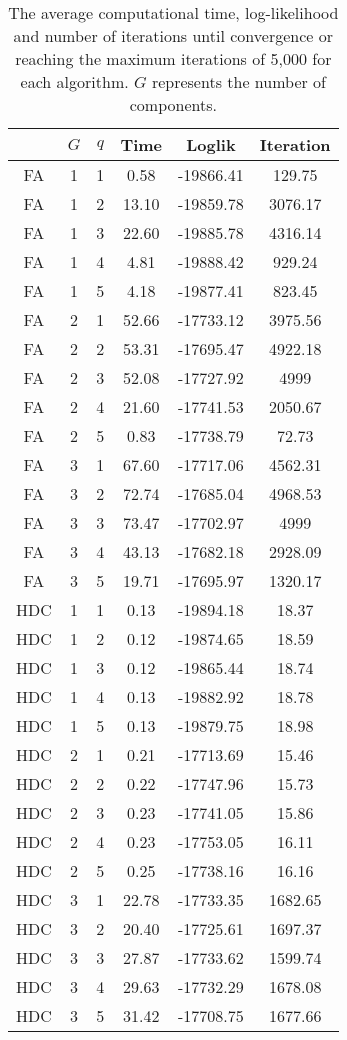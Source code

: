 \documentclass[11pt]{article}
\begin{document}
\begin {table}
\caption {The average computational time, log-likelihood and number of iterations until convergence or reaching the maximum iterations of 5,000 for each algorithm. $G$ represents the number of components.} \label{tab:title} 
\begin{center}
\def\arraystretch{1.5}
\begin{tabular}{ |c|c|c|c|c|c| } 
\hline
 & $G$ & $q$ & Time & Loglik & Iteration\\
\hline
FA&1&	1&0.58	&-19866.41&	129.75\\
FA&1&	2&13.10&	-19859.78&	3076.17\\
FA&1&	3&22.60&	-19885.78&	4316.14\\
FA&1&	4&4.81&	-19888.42&	929.24\\
FA&1&	5&4.18&	-19877.41&	823.45\\
FA&2&	1&52.66&	-17733.12	&3975.56\\
FA&2&	2&53.31&	-17695.47&	4922.18\\
FA&2&	3&52.08&	-17727.92&	4999\\
FA&2&	4&21.60&	-17741.53&	2050.67\\
FA&2&	5&0.83&	-17738.79&	72.73\\
FA&3&	1&67.60&	-17717.06&	4562.31\\
FA&3&	2&72.74&	-17685.04&	4968.53\\
FA&3&	3&73.47&	-17702.97&	4999\\
FA&3&	4&43.13&	-17682.18&	2928.09\\
FA&3&	5&19.71&	-17695.97&	1320.17\\
\hline
HDC&1&	1&0.13&	-19894.18&	18.37\\
HDC&1&	2&	0.12&	-19874.65&	18.59\\
HDC&1&	3&0.12& -19865.44	&18.74\\
HDC&1&	4&	0.13	&-19882.92	&18.78\\
HDC&1&	5&	0.13	&-19879.75	&18.98\\
HDC&2&	1&	0.21	&-17713.69	&15.46\\
HDC&2&	2& 0.22	&-17747.96	&15.73\\
HDC&2&	3&	0.23	&-17741.05	&15.86\\
HDC&2&	4& 0.23	&-17753.05	&16.11\\
HDC&2&	5&	0.25	&-17738.16	&16.16\\
HDC&3&	1&	22.78&	-17733.35&	1682.65\\
HDC&3&	2&	20.40&	-17725.61&	1697.37\\
HDC&3&	3&	27.87&	-17733.62&	1599.74\\
HDC&3&	4&	29.63&	-17732.29	&1678.08\\
HDC&3&	5&	31.42&	-17708.75&	1677.66\\
\hline
\end{tabular}
\end{center} 
\end {table}
\end{document}
